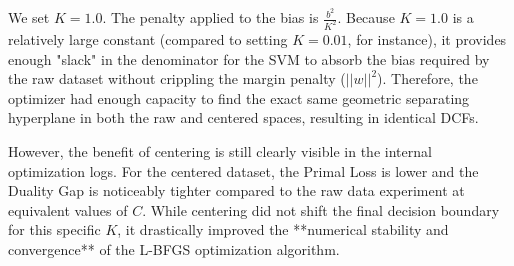 We set $K=1.0$. The penalty applied to the bias is $\frac{b^2}{K^2}$. Because $K=1.0$ is a relatively large constant (compared to setting $K=0.01$, for instance), it provides enough "slack" in the denominator for the SVM to absorb the bias required by the raw dataset without crippling the margin penalty ($||w||^2$). Therefore, the optimizer had enough capacity to find the exact same geometric separating hyperplane in both the raw and centered spaces, resulting in identical DCFs.

However, the benefit of centering is still clearly visible in the internal optimization logs. For the centered dataset, the Primal Loss is lower and the Duality Gap is noticeably tighter compared to the raw data experiment at equivalent values of $C$. While centering did not shift the final decision boundary for this specific $K$, it drastically improved the **numerical stability and convergence** of the L-BFGS optimization algorithm.